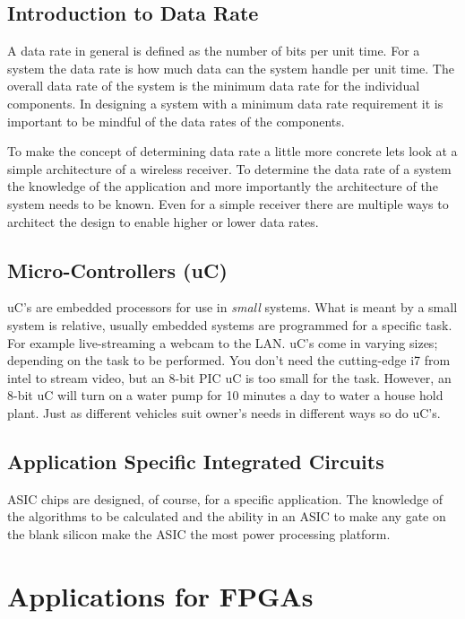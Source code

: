 \subsection{Introduction to Data Rate}
A data rate in general is defined as the number of bits per unit time. For a system the data rate is how much data can the system handle per unit time. The overall data rate of the system is the minimum data rate for the individual components. In designing a system with a minimum data rate requirement it is important to be mindful of the data rates of the components.

To make the concept of determining data rate a little more concrete lets look at a simple architecture of a wireless receiver. To determine the data rate of a system the knowledge of the application and more importantly the architecture of the system needs to be known. Even for a simple receiver there are multiple ways to architect the design to enable higher or lower data rates. 


\subsection{Micro-Controllers (uC)}
\ac{uC}'s are embedded processors for use in \emph{small} systems. What is meant by a small system is relative, usually embedded systems are programmed for a specific task. For example live-streaming a webcam to the \ac{LAN}. \ac{uC}'s come in varying sizes; depending on the task to be performed. You don't need the cutting-edge i7 from intel to stream video, but an 8-bit \ac{PIC} \ac{uC} is too small for the task. However, an 8-bit \ac{uC} will turn on a water pump for 10 minutes a day to water a house hold plant. Just as different vehicles suit owner's needs in different ways so do \ac{uC}'s.

\subsection{Application Specific Integrated Circuits}
\ac{ASIC} chips are designed, of course, for a specific application. The knowledge of the algorithms to be calculated and the ability in an \ac{ASIC} to make any gate on the blank silicon make the \ac{ASIC} the most power processing platform. 
 

\section{Applications for FPGAs}

